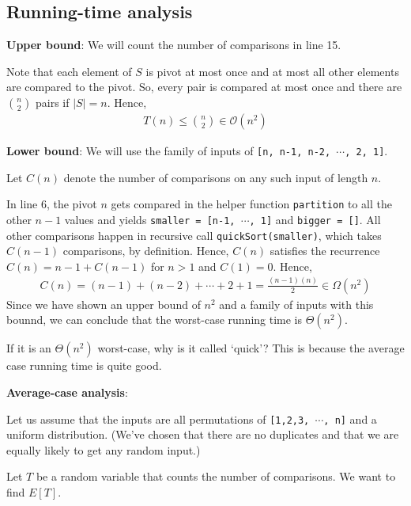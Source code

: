 \documentclass[11pt]{article}
\begin{document}
\subsection{Running-time analysis}
\textbf{Upper bound}: We will count the number of comparisons in line 15. 

Note that each element of $S$ is pivot at most once and at most all other elements are compared to the pivot. So, every pair is compared at most once and there are ${n \choose 2}$ pairs if $|S| = n$. Hence, 
\begin{align*}
    T(n) \leq {n \choose 2} \in \mathcal{O}(n^2)
\end{align*}

\textbf{Lower bound}: We will use the family of inputs of \texttt{[n, n-1, n-2, $\cdots$, 2, 1]}. 

Let $C(n)$ denote the number of comparisons on any such input of length $n$.

In line 6, the pivot $n$ gets compared in the helper function \texttt{partition} to all the other $n-1$ values and yields \texttt{smaller = [n-1, $\cdots$, 1]} and \texttt{bigger = []}. All other comparisons happen in recursive call \texttt{quickSort(smaller)}, which takes $C(n-1)$ comparisons, by definition. Hence, $C(n)$ satisfies the recurrence $C(n) = n-1 + C(n-1)$ for $n > 1$ and $C(1) = 0$. Hence, 
\begin{align*}
    C(n) = (n-1) + (n-2) + \cdots + 2 + 1 = \frac{(n-1)(n)}{2} \in \Omega(n^2)
\end{align*}
Since we have shown an upper bound of $n^2$ and a family of inputs with this bounnd, we can conclude that the worst-case running time is $\Theta(n^2)$. 

If it is an $\Theta(n^2)$ worst-case, why is it called `quick'? This is because the average case running time is quite good. 

\textbf{Average-case analysis}:

Let us assume that the inputs are all permutations of \texttt{[1,2,3, $\cdots$, n]} and a uniform distribution. (We've chosen that there are no duplicates and that we are equally likely to get any random input.)

Let $T$ be a random variable that counts the number of comparisons. We want to find $E[T]$. 
\end{document}
